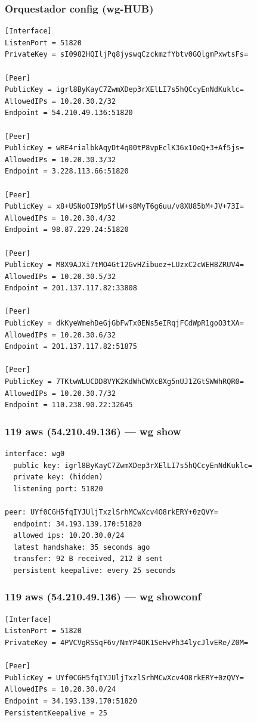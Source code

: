 \documentclass[11pt,a4paper]{article}
\begin{document}
\subsubsection*{Orquestador config (wg-HUB)}
\begin{lstlisting}
[Interface]
ListenPort = 51820
PrivateKey = sI0982HQIljPq8jyswqCzckmzfYbtv0GQlgmPxwtsFs=

[Peer]
PublicKey = igrl8ByKayC7ZwmXDep3rXElLI7s5hQCcyEnNdKuklc=
AllowedIPs = 10.20.30.2/32
Endpoint = 54.210.49.136:51820

[Peer]
PublicKey = wRE4rialbkAqyDt4q00tP8vpEclK36x1OeQ+3+Af5js=
AllowedIPs = 10.20.30.3/32
Endpoint = 3.228.113.66:51820

[Peer]
PublicKey = x8+USNo0I9MpSflW+s8MyT6g6uu/v8XU85bM+JV+73I=
AllowedIPs = 10.20.30.4/32
Endpoint = 98.87.229.24:51820

[Peer]
PublicKey = M8X9AJXi7tMO4Gt12GvHZibuez+LUzxC2cWEH8ZRUV4=
AllowedIPs = 10.20.30.5/32
Endpoint = 201.137.117.82:33808

[Peer]
PublicKey = dkKyeWmehDeGjGbFwTx0ENs5eIRqjFCdWpR1goO3tXA=
AllowedIPs = 10.20.30.6/32
Endpoint = 201.137.117.82:51875

[Peer]
PublicKey = 7TKtwWLUCDD8VYK2KdWhCWXcBXg5nUJ1ZGtSWWhRQR0=
AllowedIPs = 10.20.30.7/32
Endpoint = 110.238.90.22:32645

\end{lstlisting}

\subsubsection*{119 aws (54.210.49.136) — wg show}
\begin{lstlisting}
interface: wg0
  public key: igrl8ByKayC7ZwmXDep3rXElLI7s5hQCcyEnNdKuklc=
  private key: (hidden)
  listening port: 51820

peer: UYf0CGH5fqIYJUljTxzlSrhMCwXcv4O8rkERY+0zQVY=
  endpoint: 34.193.139.170:51820
  allowed ips: 10.20.30.0/24
  latest handshake: 35 seconds ago
  transfer: 92 B received, 212 B sent
  persistent keepalive: every 25 seconds

\end{lstlisting}

\subsubsection*{119 aws (54.210.49.136) — wg showconf}
\begin{lstlisting}
[Interface]
ListenPort = 51820
PrivateKey = 4PVCVgRSSqF6v/NmYP4OK1SeHvPh34lycJlvERe/Z0M=

[Peer]
PublicKey = UYf0CGH5fqIYJUljTxzlSrhMCwXcv4O8rkERY+0zQVY=
AllowedIPs = 10.20.30.0/24
Endpoint = 34.193.139.170:51820
PersistentKeepalive = 25

\end{lstlisting}
\end{document}
